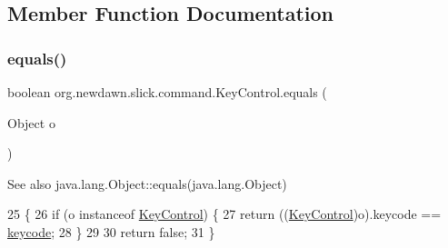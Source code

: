 \subsection{Member Function Documentation}
\mbox{\label{classorg_1_1newdawn_1_1slick_1_1command_1_1_key_control_af2e1c999f4d9231969618018e8838b2f}} 
\subsubsection{\texorpdfstring{equals()}{equals()}}
{\footnotesize\ttfamily boolean org.\+newdawn.\+slick.\+command.\+Key\+Control.\+equals (\begin{DoxyParamCaption}\item[{Object}]{o }\end{DoxyParamCaption})\hspace{0.3cm}{\ttfamily [inline]}}

\begin{DoxySeeAlso}{See also}
java.\+lang.\+Object\+::equals(java.\+lang.\+Object) 
\end{DoxySeeAlso}

\begin{DoxyCode}
25                                     \{
26         \textcolor{keywordflow}{if} (o instanceof \mbox{\hyperlink{classorg_1_1newdawn_1_1slick_1_1command_1_1_key_control_ae585fe955bcc9da50286f092dd9ee7f4}{KeyControl}}) \{
27             \textcolor{keywordflow}{return} ((\mbox{\hyperlink{classorg_1_1newdawn_1_1slick_1_1command_1_1_key_control_ae585fe955bcc9da50286f092dd9ee7f4}{KeyControl}})o).keycode == \mbox{\hyperlink{classorg_1_1newdawn_1_1slick_1_1command_1_1_key_control_ad8edd8c70be8e811bbc7049f9fea0746}{keycode}};
28         \}
29         
30         \textcolor{keywordflow}{return} \textcolor{keyword}{false};
31     \}
\end{DoxyCode}
\mbox{\label{classorg_1_1newdawn_1_1slick_1_1command_1_1_key_control_a380aee4004516247655bd52f27c692a0}} 
